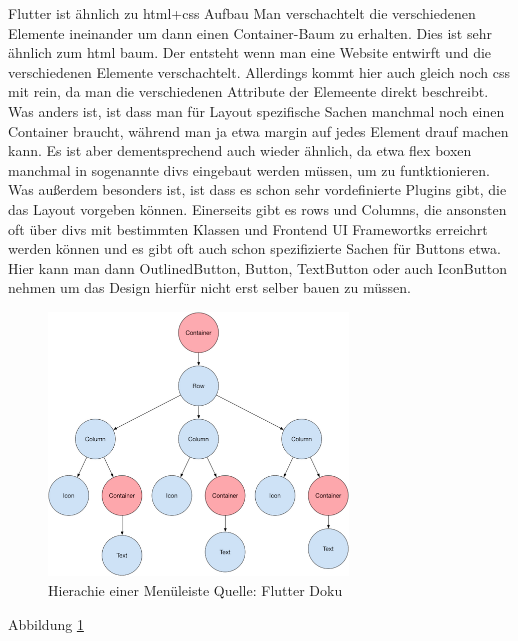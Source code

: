 Flutter ist ähnlich zu html+css Aufbau Man verschachtelt die verschiedenen Elemente ineinander um dann einen Container-Baum zu erhalten.
Dies ist sehr ähnlich zum html baum. Der entsteht wenn man eine Website entwirft und die verschiedenen Elemente verschachtelt. 
Allerdings kommt hier auch gleich noch css mit rein, da man die verschiedenen Attribute der Elemeente direkt beschreibt.
Was anders ist, ist dass man für Layout spezifische Sachen manchmal noch einen Container braucht, während man ja etwa margin auf jedes Element drauf machen kann. Es ist aber dementsprechend auch wieder ähnlich, da etwa flex boxen manchmal in sogenannte divs eingebaut werden müssen, um zu funtktionieren. Was außerdem besonders ist, ist dass es schon sehr vordefinierte Plugins gibt, die das Layout vorgeben können. Einerseits gibt es rows und Columns, die ansonsten oft über divs mit bestimmten Klassen und Frontend UI Framewortks erreichrt werden können und es gibt oft auch schon spezifizierte Sachen für Buttons etwa. Hier kann man dann OutlinedButton, Button, TextButton oder auch IconButton nehmen um das Design hierfür nicht erst selber bauen zu müssen.

\begin{figure}[ht]
  \centering
  \includegraphics[height=7cm,keepaspectratio]{images/sample-flutter-layout.png} 
  \caption{Hierachie einer Menüleiste Quelle: Flutter Doku}
  \label{fig:flutter_layout_tree}
\end{figure}

Abbildung \ref{fig:flutter_layout_tree}

